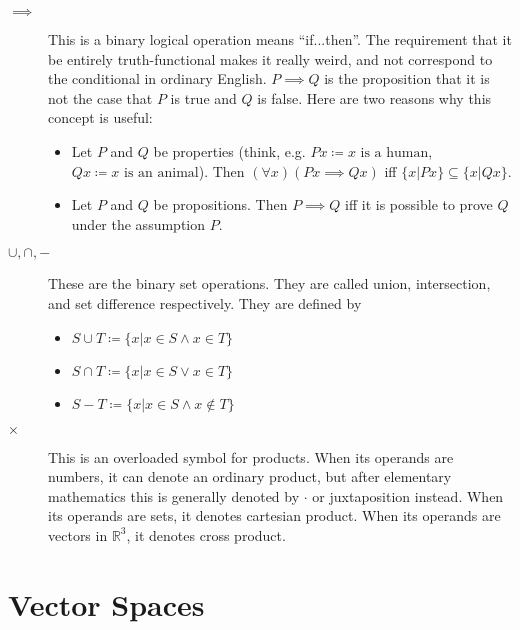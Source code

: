 \documentclass[12pt]{article}
\begin{document}
\begin{description}
  \item[$\implies$] This is a binary logical operation means
    ``if...then''.  The requirement that it be entirely
    truth-functional makes it really weird, and not correspond to the
    conditional in ordinary English.  $P\implies Q$ is the proposition
    that it is not the case that $P$ is true and $Q$ is false.  Here
    are two reasons why this concept is useful:
    \begin{itemize}
      \item Let $P$ and $Q$ be properties (think, e.g. $Px\coloneqq
        x\textrm{ is a human}$, $Qx\coloneqq x\textrm{ is an
          animal}$).  Then $(\forall x)(Px\implies Qx)$ iff
        $\{x|Px\}\subseteq \{x|Qx\}$.
      \item Let $P$ and $Q$ be propositions.  Then $P\implies Q$ iff
        it is possible to prove $Q$ under the assumption $P$.
    \end{itemize}
    
  \item[$\cup,\cap,-$] These are the binary set operations.  They are
    called union, intersection, and set difference respectively.  They
    are defined by
    \begin{itemize}
    \item $S\cup T \coloneqq \{x | x\in S \wedge x\in T\}$ 
    \item $S\cap T \coloneqq \{x | x\in S \vee x\in T\}$ 
    \item $S-T \coloneqq \{x | x\in S \wedge x\not\in T\}$ 
    \end{itemize}

  \item[$\times$] This is an overloaded symbol for products.  When its
    operands are numbers, it can denote an ordinary product, but after
    elementary mathematics this is generally denoted by $\cdot$ or
    juxtaposition instead.  When its operands are sets, it denotes
    cartesian product.  When its operands are vectors in
    $\mathbb{R}^3$, it denotes cross product.

    \end{description}
    
\section{Vector Spaces}
\end{document}

